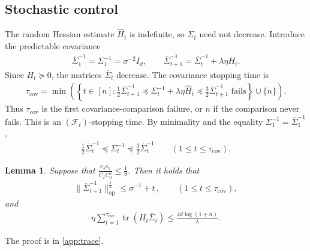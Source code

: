 \documentclass[11pt]{article}
\newtheorem{lemma}[lemma]{Lemma}
\newcommand{\tr}{\operatorname{tr}}
\newcommand{\Lip}{\operatorname{Lip}}
\newcommand{\op}{\mathrm{op}}
\newcommand{\1}{\mathbf 1}
\newcommand{\eps}{\varepsilon}
\begin{document}
\subsection{Stochastic control}
\label{sec:stochastic-control}
The random Hessian estimate $\hat{H}_t$ is indefinite, so $\Sigma_t$ need not decrease.
Introduce the predictable covariance
\begin{align}
    \overline\Sigma_1^{-1}=\Sigma_1^{-1} = \sigma^{-2}I_d,
    \qquad
    \overline\Sigma_{t+1}^{-1}
    =\overline\Sigma_t^{-1}+\lambda\eta H_t.
    \label{eq:predictable-covariance}
\end{align}
Since $H_t\succeq0$, the matrices $\overline\Sigma_t$ decrease.
The covariance stopping time is
\begin{align}
    \tau_{\mathrm{cov}}
    =
    \min\left(
    \left\{
    t \in [n]:
    \frac12 \overline\Sigma_{t+1}^{-1}
    \preceq
    \Sigma_t^{-1}+\lambda\eta\widehat H_t
    \preceq
    \frac32 \overline\Sigma_{t+1}^{-1}
    \text{ fails}
    \right\}
    \cup\{n\}
    \right).
    \label{eq:covariance-stopping-time}
\end{align}
Thus $\tau_{\mathrm{cov}}$ is the first covariance-comparison failure, or $n$
if the comparison never fails.  This is an $(\mathcal F_t)$-stopping time.
By minimality and the equality $\Sigma_1^{-1}=\overline\Sigma_1^{-1}$,
\begin{align}
    \frac12\overline\Sigma_t^{-1}
    \preceq\Sigma_t^{-1}
    \preceq\frac32\overline\Sigma_t^{-1}
    \qquad(1\leq t\leq\tau_{\mathrm{cov}}).
    \label{eq:covariance-comparison}
\end{align}
\begin{lemma}
    \label{lem:trace}
    Suppose that $\frac{c_\lambda c_\eta}{C_\eps C_0^6}\leq\frac{1}{8}$.
    Then it holds that
    \begin{align}
        \|\overline\Sigma_{t+1}^{-1}\|_{\op}^{\frac12}
        \leq
        \sigma^{-1}+t\,,
        \qquad(1\leq t\leq \tau_{\mathrm{cov}}),
        \label{eq:predictable-spectrum}
    \end{align}
    and
    \begin{align}
        \eta\sum_{t=1}^{\tau_{\mathrm{cov}}}
        \tr(H_t\overline\Sigma_t)
        \leq\frac{4d\log(1 + n)}{\lambda}.
        \label{eq:trace-budget}
    \end{align}
\end{lemma}
The proof is in \cref{app:trace}.
\end{document}
